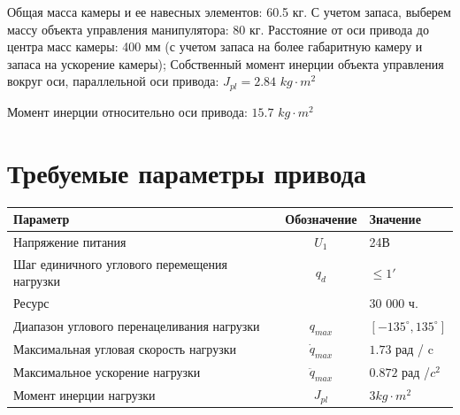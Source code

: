 Общая масса камеры и ее навесных элементов: 60.5 кг. С учетом запаса, выберем
массу объекта управления манипулятора: 80 кг.
Расстояние от оси привода до центра масс камеры: 400 мм (с учетом запаса
на более габаритную камеру и запаса на ускорение камеры);
Собственный момент инерции объекта управления вокруг оси, параллельной оси привода:
$ J_{pl} = 2.84 $ $kg \cdot m^2 $

Момент инерции относительно оси привода:
$ 15.7 $ $ kg \cdot m^2 $


\section{Требуемые параметры привода}

\begin{tabular}{|l|c|l|}
\hline
Параметр                                    & Обозначение      & Значение                   \\
\hline
Напряжение питания                          & $U_1$            & 24В                        \\
Шаг единичного углового перемещения нагрузки& $q_d$            & $ \le 1' $                 \\
Ресурс                                      &                  & 30 000 ч.                  \\
Диапазон углового перенацеливания нагрузки  & $q_{max}$        & $[-135^\circ, 135^\circ] $ \\
Максимальная угловая скорость нагрузки      & $\dot{q}_{max}$  & $1.73$ рад / c             \\
Максимальное ускорение нагрузки             & $\ddot{q}_{max}$ & $0.872$ рад /$c^2$         \\
Момент инерции нагрузки                     & $J_{pl}$         & $3 kg \cdot m^2 $          \\
\hline
\end{tabular}

\endinput

